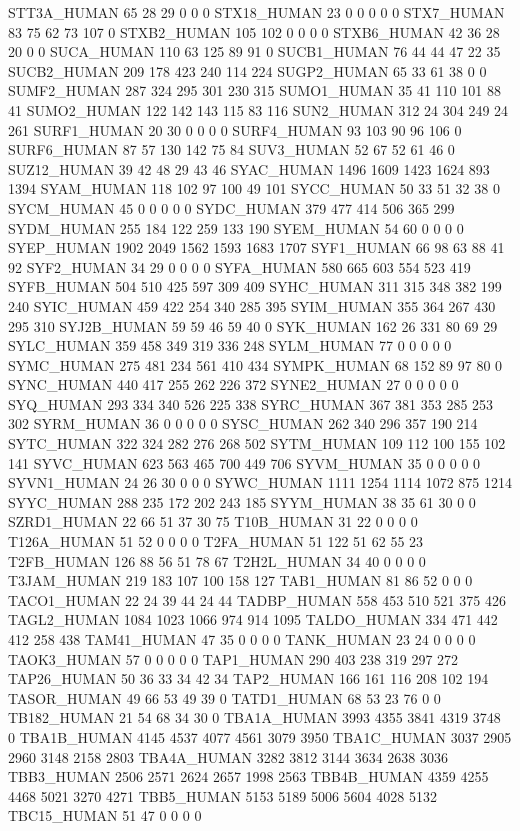 STT3A_HUMAN	65	28	29	0	0	0
STX18_HUMAN	23	0	0	0	0	0
STX7_HUMAN	83	75	62	73	107	0
STXB2_HUMAN	105	102	0	0	0	0
STXB6_HUMAN	42	36	28	20	0	0
SUCA_HUMAN	110	63	125	89	91	0
SUCB1_HUMAN	76	44	44	47	22	35
SUCB2_HUMAN	209	178	423	240	114	224
SUGP2_HUMAN	65	33	61	38	0	0
SUMF2_HUMAN	287	324	295	301	230	315
SUMO1_HUMAN	35	41	110	101	88	41
SUMO2_HUMAN	122	142	143	115	83	116
SUN2_HUMAN	312	24	304	249	24	261
SURF1_HUMAN	20	30	0	0	0	0
SURF4_HUMAN	93	103	90	96	106	0
SURF6_HUMAN	87	57	130	142	75	84
SUV3_HUMAN	52	67	52	61	46	0
SUZ12_HUMAN	39	42	48	29	43	46
SYAC_HUMAN	1496	1609	1423	1624	893	1394
SYAM_HUMAN	118	102	97	100	49	101
SYCC_HUMAN	50	33	51	32	38	0
SYCM_HUMAN	45	0	0	0	0	0
SYDC_HUMAN	379	477	414	506	365	299
SYDM_HUMAN	255	184	122	259	133	190
SYEM_HUMAN	54	60	0	0	0	0
SYEP_HUMAN	1902	2049	1562	1593	1683	1707
SYF1_HUMAN	66	98	63	88	41	92
SYF2_HUMAN	34	29	0	0	0	0
SYFA_HUMAN	580	665	603	554	523	419
SYFB_HUMAN	504	510	425	597	309	409
SYHC_HUMAN	311	315	348	382	199	240
SYIC_HUMAN	459	422	254	340	285	395
SYIM_HUMAN	355	364	267	430	295	310
SYJ2B_HUMAN	59	59	46	59	40	0
SYK_HUMAN	162	26	331	80	69	29
SYLC_HUMAN	359	458	349	319	336	248
SYLM_HUMAN	77	0	0	0	0	0
SYMC_HUMAN	275	481	234	561	410	434
SYMPK_HUMAN	68	152	89	97	80	0
SYNC_HUMAN	440	417	255	262	226	372
SYNE2_HUMAN	27	0	0	0	0	0
SYQ_HUMAN	293	334	340	526	225	338
SYRC_HUMAN	367	381	353	285	253	302
SYRM_HUMAN	36	0	0	0	0	0
SYSC_HUMAN	262	340	296	357	190	214
SYTC_HUMAN	322	324	282	276	268	502
SYTM_HUMAN	109	112	100	155	102	141
SYVC_HUMAN	623	563	465	700	449	706
SYVM_HUMAN	35	0	0	0	0	0
SYVN1_HUMAN	24	26	30	0	0	0
SYWC_HUMAN	1111	1254	1114	1072	875	1214
SYYC_HUMAN	288	235	172	202	243	185
SYYM_HUMAN	38	35	61	30	0	0
SZRD1_HUMAN	22	66	51	37	30	75
T10B_HUMAN	31	22	0	0	0	0
T126A_HUMAN	51	52	0	0	0	0
T2FA_HUMAN	51	122	51	62	55	23
T2FB_HUMAN	126	88	56	51	78	67
T2H2L_HUMAN	34	40	0	0	0	0
T3JAM_HUMAN	219	183	107	100	158	127
TAB1_HUMAN	81	86	52	0	0	0
TACO1_HUMAN	22	24	39	44	24	44
TADBP_HUMAN	558	453	510	521	375	426
TAGL2_HUMAN	1084	1023	1066	974	914	1095
TALDO_HUMAN	334	471	442	412	258	438
TAM41_HUMAN	47	35	0	0	0	0
TANK_HUMAN	23	24	0	0	0	0
TAOK3_HUMAN	57	0	0	0	0	0
TAP1_HUMAN	290	403	238	319	297	272
TAP26_HUMAN	50	36	33	34	42	34
TAP2_HUMAN	166	161	116	208	102	194
TASOR_HUMAN	49	66	53	49	39	0
TATD1_HUMAN	68	53	23	76	0	0
TB182_HUMAN	21	54	68	34	30	0
TBA1A_HUMAN	3993	4355	3841	4319	3748	0
TBA1B_HUMAN	4145	4537	4077	4561	3079	3950
TBA1C_HUMAN	3037	2905	2960	3148	2158	2803
TBA4A_HUMAN	3282	3812	3144	3634	2638	3036
TBB3_HUMAN	2506	2571	2624	2657	1998	2563
TBB4B_HUMAN	4359	4255	4468	5021	3270	4271
TBB5_HUMAN	5153	5189	5006	5604	4028	5132
TBC15_HUMAN	51	47	0	0	0	0
